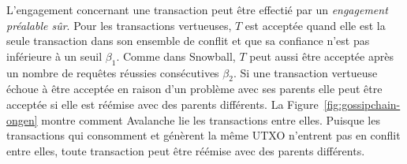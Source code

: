 L'engagement concernant une transaction peut être effectié par un \emph{engagement préalable sûr}. Pour les transactions vertueuses, $T$ est acceptée quand elle est la seule transaction dans son ensemble de conflit et que sa confiance n'est pas inférieure à un seuil $\beta_1$.
Comme dans Snowball, $T$ peut aussi être acceptée après un nombre de requêtes réussies consécutives $\beta_2$.
Si une transaction vertueuse échoue à être acceptée en raison d'un problème avec ses parents elle peut être acceptée si elle est réémise avec des parents différents.
La Figure~\ref{fig:gossipchain-ongen} montre comment Avalanche lie les transactions entre elles. Puisque les transactions qui consomment et génèrent la même UTXO n'entrent pas en conflit entre elles, toute transaction peut être réémise avec des parents différents.

